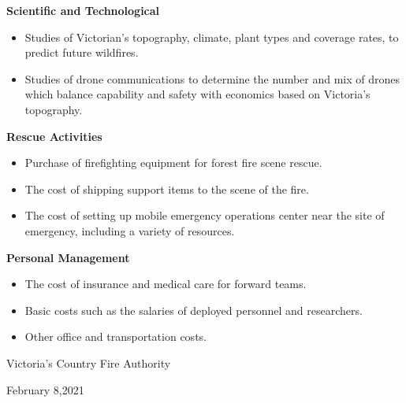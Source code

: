 \documentclass{mcmthesis}
\begin{document}
\textbf{Scientific and Technological}
\begin{itemize}
  \item Studies of Victorian’s topography, climate, plant types and coverage rates, to predict future wildfires.
  \item Studies of drone communications to determine the number and mix of drones which balance capability and safety with economics based on Victoria's topography.
\end{itemize}
\textbf{Rescue Activities}
\begin{itemize}
  \item Purchase of firefighting equipment for forest fire scene rescue.
  \item The cost of shipping support items to the scene of the fire.
  \item The cost of setting up mobile emergency operations center near the site of emergency, including a variety of resources.
  \end{itemize}
\textbf{Personal Management}
\begin{itemize}
  \item The cost of insurance and medical care for forward teams.
  \item Basic costs such as the salaries of deployed personnel and researchers.
  \item Other office and transportation costs. 
\end{itemize}
\begin{flushright}
Victoria’s Country Fire Authority

February 8,2021
\end{flushright}



\end{document}
